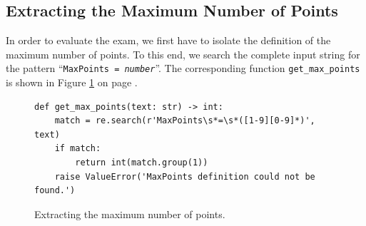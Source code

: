 \subsection{Extracting the Maximum Number of Points}
In order to evaluate the exam, we first have to isolate the definition of the maximum number of points.  To this
end, we search the complete input string for the pattern ``\texttt{MaxPoints = \textsl{number}}''.  The
corresponding function \texttt{get\_max\_points} is shown in Figure \ref{fig:get-max-points.py} on page
\pageref{fig:get-max-points.py}.

\begin{figure}[!ht]
\centering
  \begin{verbatim}
def get_max_points(text: str) -> int:
    match = re.search(r'MaxPoints\s*=\s*([1-9][0-9]*)', text)
    if match:
        return int(match.group(1))
    raise ValueError('MaxPoints definition could not be found.')
\end{verbatim}
\vspace*{-0.3cm}
\caption{Extracting the maximum number of points.}
\label{fig:get-max-points.py}
\end{figure}

